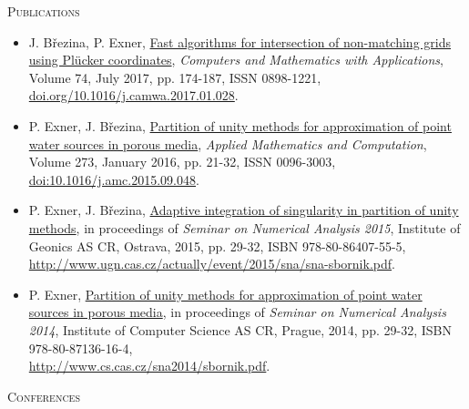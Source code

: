 \documentclass[bibliography=totocnumbered,dvipsnames,FM,Dis]{tulthesis}
\begin{document}
\large\textsc{Publications}
\begin{itemize}[label={}]

\item
J. B{\v r}ezina, P. Exner, \href{http://www.sciencedirect.com/science/article/pii/S0898122117300792}{Fast algorithms for intersection of non-matching grids using Plücker coordinates},
\emph{Computers and Mathematics with Applications}, Volume 74, July 2017, pp. 174-187, ISSN 0898-1221, \href{https://doi.org/10.1016/j.camwa.2017.01.028}{doi.org/10.1016/j.camwa.2017.01.028}.

\item
P. Exner, J. B{\v r}ezina, \href{http://www.sciencedirect.com/science/article/pii/S0096300315012862}{Partition of unity methods for approximation of point water sources in porous media},
\emph{Applied Mathematics and Computation}, Volume 273, January 2016, pp. 21-32, ISSN 0096-3003, \href{http://dx.doi.org/10.1016/j.amc.2015.09.048}{doi:10.1016/j.amc.2015.09.048}.

\item
P. Exner, J. B{\v r}ezina, \href{http://www.ugn.cas.cz/actually/event/2015/sna/sna-sbornik.pdf}{Adaptive integration of singularity in partition of unity methods},
in proceedings of \emph{Seminar on Numerical Analysis 2015}, Institute of Geonics AS CR, Ostrava, 2015, pp. 29-32, ISBN 978-80-86407-55-5, \\
\href{http://www.ugn.cas.cz/actually/event/2015/sna/sna-sbornik.pdf}{http://www.ugn.cas.cz/actually/event/2015/sna/sna-sbornik.pdf}.

\item
P. Exner, \href{http://www.cs.cas.cz/sna2014/sbornik.pdf}{Partition of unity methods for approximation of point water sources in porous media},
in proceedings of \emph{Seminar on Numerical Analysis 2014}, Institute of Computer Science AS CR, Prague, 2014, pp. 29-32, ISBN 978-80-87136-16-4, \\
\href{http://www.cs.cas.cz/sna2014/sbornik.pdf}{http://www.cs.cas.cz/sna2014/sbornik.pdf}.


\end{itemize}
%
\vspace{0.5cm}
%
\large\textsc{Conferences}
%
\end{document}
